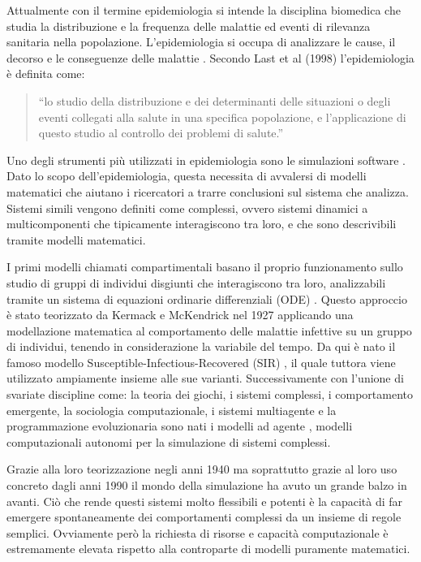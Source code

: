Attualmente con il termine epidemiologia si intende la 
disciplina biomedica che studia la distribuzione e la 
frequenza delle malattie ed eventi di rilevanza sanitaria 
nella popolazione. L’epidemiologia si occupa di analizzare 
le cause, il decorso e le conseguenze delle malattie \cite{wiki:Epidemiologia}. 
Secondo Last et al (1998) l’epidemiologia è definita come: 

\begin{quotation}
    “lo studio della distribuzione e dei determinanti 
    delle situazioni o degli eventi collegati alla salute 
    in una specifica popolazione, e l'applicazione di 
    questo studio al controllo dei problemi di salute.”
\end{quotation}

Uno degli strumenti più utilizzati in epidemiologia sono le 
simulazioni software \cite{wiki:Simulation_software}. 
Dato lo scopo dell’epidemiologia, questa necessita di 
avvalersi di modelli matematici \cite{doi:10.4161/viru.24041} 
che aiutano i ricercatori a trarre conclusioni sul sistema 
che analizza. Sistemi simili vengono definiti come complessi,
\cite{Galea2009-lj} \cite{Ladyman2013} ovvero sistemi 
dinamici a multicomponenti che tipicamente interagiscono 
tra loro, e che sono descrivibili tramite modelli matematici. 

I primi modelli chiamati compartimentali \cite{Bjørnstad2020} 
basano il proprio funzionamento sullo studio di gruppi di 
individui disgiunti che interagiscono tra loro, 
analizzabili tramite un sistema di equazioni ordinarie 
differenziali (ODE) \cite{Brauer2008}. 
Questo approccio è stato teorizzato da Kermack e McKendrick 
nel 1927 applicando una modellazione matematica al comportamento 
delle malattie infettive su un gruppo di individui, tenendo in 
considerazione la variabile del tempo. Da qui è nato il famoso modello 
Susceptible-Infectious-Recovered (SIR) \cite{wiki:Compartmental_models_in_epidemiology}, 
il quale tuttora viene utilizzato ampiamente insieme alle sue varianti. 
Successivamente con l’unione di svariate discipline come: 
la teoria dei giochi, i sistemi complessi, i comportamento emergente, 
la sociologia computazionale, i sistemi multiagente e 
la programmazione evoluzionaria sono nati i modelli ad agente 
\cite{7822080} \cite{Bissett2021}, modelli computazionali 
autonomi per la simulazione di sistemi complessi. 

Grazie alla loro teorizzazione negli anni 1940 ma soprattutto 
grazie al loro uso concreto dagli anni 1990 il mondo della 
simulazione ha avuto un grande balzo in avanti. 
Ciò che rende questi sistemi molto flessibili e potenti è la 
capacità di far emergere spontaneamente dei comportamenti 
complessi da un insieme di regole semplici. 
Ovviamente però la richiesta di risorse e capacità 
computazionale è estremamente elevata rispetto alla 
controparte di modelli puramente matematici. 

